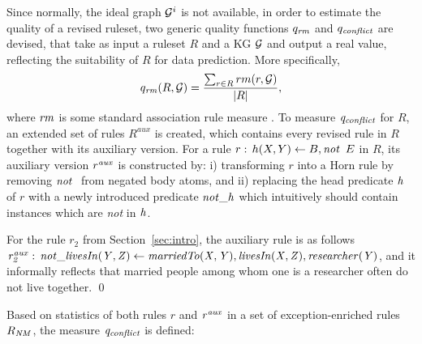 Since normally, the ideal graph $\mathcal{G}^i$ is not available, in order to estimate the quality of a
revised ruleset, two generic quality functions $q_{\mathit{rm}}$ and
$q_{\mathit{conflict}}$ are devised, that take as input a ruleset $R$ and a KG $\mathcal{G}$ and output a
real value, reflecting the suitability of $R$ for data prediction.  More
specifically, \begin{equation}q_{\mathit{rm}} (R,\mathcal{G})=\dfrac{\sum_{r\in
    R}rm(r,\mathcal{G})}{|R|}, \end{equation} where $\mathit{rm}$ is some standard
association rule measure \cite{Azevedo2007}. To measure $\mathit{q_{conflict}}$ for
$R$, an extended set of rules $R^{aux}$ is created, which contains every %
revised rule in $R$ %
together with %
its auxiliary version. For a rule $r:\,h(X,Y)\leftarrow B,\mathit{not}~ \,E$ in $R$,
its auxiliary version $r^{\mathit{aux}}$ is constructed by: i) transforming $r$ into a Horn rule by
removing %
$\naf$ from negated body atoms, %
and ii) replacing the head
predicate $\mathit{h}$ of $r$ %
with a newly introduced predicate $\mathit{not\_h}$ which intuitively should contain %
instances which are \emph{not} in $\mathit{h}$. 

\begin{example} For the rule $r_2$ from Section~\ref{sec:intro}, the auxiliary rule is as follows $\mathit{r_2^{aux}:\,not\_livesIn(Y,Z)\leftarrow marriedTo(X,Y),livesIn(X,Z),researcher(Y)}$, and it informally reflects that married people among whom one is a researcher often do not live together. \qed
\end{example}


Based on statistics of both rules $r$ and $\mathit{r^{aux}}$ in a set of exception-enriched rules $R_{\mathit{NM}}$, the measure $\mathit{q_{conflict}}$ is defined:

